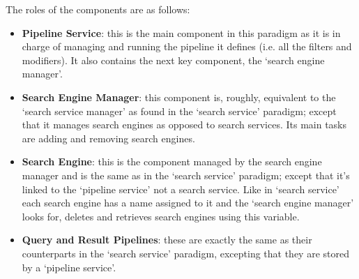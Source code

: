 \documentclass[letterpaper,10pt,english]{sphinxmanual}
\begin{document}
The roles of the components are as follows:
\begin{itemize}
\item {} 
\textbf{Pipeline Service}: this is the main component in this paradigm as it is in charge of managing and running the pipeline it defines (i.e. all the filters and modifiers). It also contains the next key component, the `search engine manager'.

\item {} 
\textbf{Search Engine Manager}: this component is, roughly, equivalent to the `search service manager' as found in the ‘search service’ paradigm; except that it manages search engines as opposed to search services. Its main tasks are adding and removing search engines.

\item {} 
\textbf{Search Engine}: this is the component managed by the search engine manager and is the same as in the ‘search service’ paradigm; except that it’s linked to the `pipeline service' not a search service. Like in ‘search service’ each search engine has a name assigned to it and the `search engine manager' looks for, deletes and retrieves search engines using this variable.

\item {} 
\textbf{Query and Result Pipelines}: these are exactly the same as their counterparts in the ‘search service’ paradigm, excepting that they are stored by a `pipeline service'.

\end{itemize}
\end{document}
